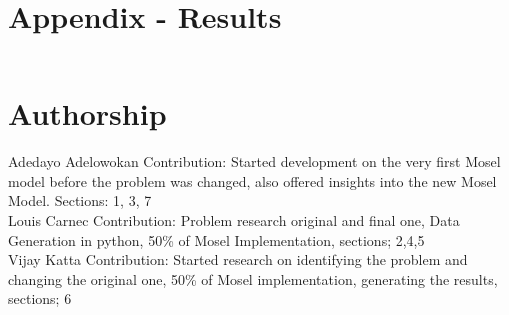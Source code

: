 \documentclass[a4paper,11pt]{article}
\begin{document}
\clearpage
\section*{Appendix - Results}



\begin{lstlisting}

\end{lstlisting}

\section*{Authorship}

Adedayo Adelowokan Contribution: Started development on the very first Mosel model before the problem was changed, also offered insights into the new Mosel Model. Sections: 1, 3, 7
 \\
\newline
Louis Carnec Contribution: Problem research original and final one, Data Generation in python, 50\% of Mosel Implementation, sections; 2,4,5 \\
\newline
Vijay Katta Contribution: Started research on identifying the problem and changing the original one, 50\% of Mosel implementation, generating the results, sections; 6 \\


\clearpage


\end{document}
